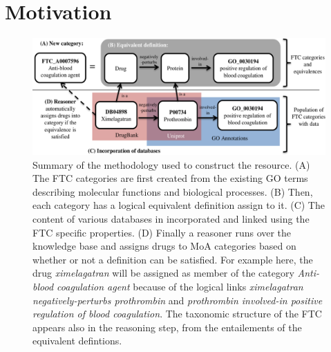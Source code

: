 \documentclass{bioinfo}
\begin{document}
\section{Motivation}

\begin{figure}[!tpb]%
\centerline{\includegraphics{fig1.png}}
\caption{Summary of the methodology used to construct the resource. (A) The FTC categories are first created from the existing GO terms
describing molecular functions and biological processes. (B) Then, each category has a logical equivalent definition assign to it.
(C) The content of various databases in incorporated and linked using the FTC specific properties. (D) Finally a reasoner runs over the knowledge
base and assigns drugs to MoA categories based on whether or not a definition can be satisfied. For example here, the drug
\emph{ximelagatran} will be assigned as member of the category \emph{Anti-blood coagulation agent} because of the logical
links \emph{ximelagatran negatively-perturbs prothrombin} and \emph{prothrombin involved-in positive regulation of blood coagulation}.
The taxonomic structure of the
FTC appears also in the reasoning step, from the entailements of the equivalent defintions.}\label{fig:01}
\end{figure}
\end{document}
